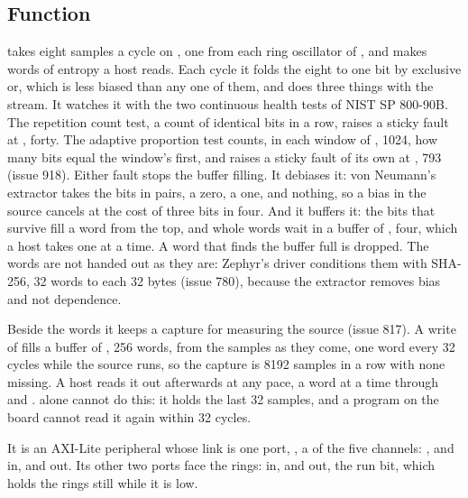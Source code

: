 
%
{}

\subsection*{Function}

 takes eight samples a cycle on , one from each
ring oscillator of , and makes words of entropy a host
reads. Each cycle it folds the eight to one bit by exclusive or, which
is less biased than any one of them, and does three things with the
stream. It watches it with the two continuous health tests of NIST SP
800-90B. The repetition count test, a count of identical bits in a
row, raises a sticky fault at , forty. The adaptive
proportion test counts, in each window of , 1024,
how many bits equal the window's first, and raises a sticky fault of
its own at , 793 (issue 918). Either fault stops the
buffer filling. It debiases
it: von Neumann's extractor takes the bits in pairs,  a zero,
 a one,  and  nothing, so a bias in the
source cancels at the cost of three bits in four. And it buffers it:
the bits that survive fill a word from the top, and whole words wait
in a buffer of , four, which a host takes one at a time.
A word that finds the buffer full is dropped.
The words are not handed out as they are: Zephyr's driver conditions
them with SHA-256, 32 words to each 32 bytes (issue 780), because the
extractor removes bias and not dependence.

Beside the words it keeps a capture for measuring the source (issue
817). A write of  fills a buffer of , 256
words, from the samples as they come, one word every 32 cycles
while the source runs, so the capture is 8192 samples in a row with
none missing. A host reads it out afterwards at any pace, a word at a
time through  and .  alone cannot
do this: it holds the last 32 samples, and a program on the board
cannot read it again within 32 cycles.

It is an AXI-Lite peripheral whose link is one port, , a
 of the five channels: , 
and  in,  and  out. Its other
two ports face the rings:  in, and  out, the run
bit, which holds the rings still while it is low.

